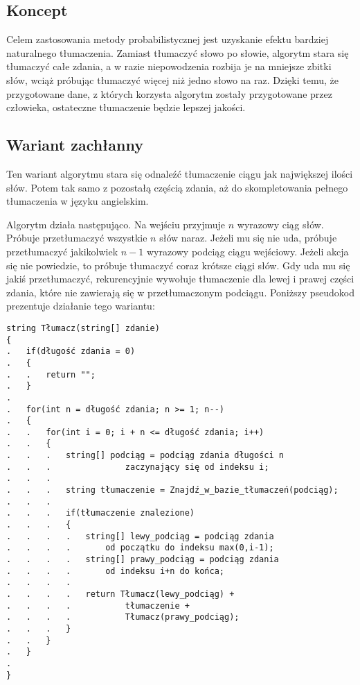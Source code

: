 \subsection{Koncept}
Celem zastosowania metody probabilistycznej jest uzyskanie efektu bardziej naturalnego tłumaczenia. Zamiast tłumaczyć słowo po słowie, algorytm stara się tłumaczyć całe zdania, a w razie niepowodzenia rozbija je na mniejsze zbitki słów, wciąż próbując tłumaczyć więcej niż jedno słowo na raz. Dzięki temu, że przygotowane dane, z których korzysta algorytm zostały przygotowane przez człowieka, ostateczne tłumaczenie będzie lepszej jakości.

\subsection{Wariant zachłanny}
Ten wariant algorytmu stara się odnaleźć tłumaczenie ciągu jak największej ilości słów. Potem tak samo z pozostałą częścią zdania, aż do skompletowania pełnego tłumaczenia w języku angielskim.

Algorytm działa następująco. Na wejściu przyjmuje $n$ wyrazowy ciąg słów. Próbuje przetłumaczyć wszystkie $n$ słów naraz. Jeżeli mu się nie uda, próbuje przetłumaczyć jakikolwiek $n-1$ wyrazowy podciąg ciągu wejściowy. Jeżeli akcja się nie powiedzie, to próbuje tłumaczyć coraz krótsze ciągi słów. Gdy uda mu się jakiś przetłumaczyć, rekurencyjnie wywołuje tłumaczenie dla lewej i prawej części zdania, które nie zawierają się w przetłumaczonym podciągu. Poniższy pseudokod prezentuje działanie tego wariantu: 

\begin{verbatim}
string Tłumacz(string[] zdanie)
{
.   if(długość zdania = 0)
.   {   
.   .   return "";
.   }
.
.   for(int n = długość zdania; n >= 1; n--)
.   {
.   .   for(int i = 0; i + n <= długość zdania; i++)
.   .   {
.   .   .   string[] podciąg = podciąg zdania długości n 
.   .   .               zaczynający się od indeksu i;
.   .   .               
.   .   .   string tłumaczenie = Znajdź_w_bazie_tłumaczeń(podciąg);
.   .   .   
.   .   .   if(tłumaczenie znalezione)
.   .   .   {
.   .   .   .   string[] lewy_podciąg = podciąg zdania 
.   .   .   .       od początku do indeksu max(0,i-1);
.   .   .   .   string[] prawy_podciąg = podciąg zdania
.   .   .   .       od indeksu i+n do końca;
.   .   .   .   
.   .   .   .   return Tłumacz(lewy_podciąg) +
.   .   .   .           tłumaczenie +
.   .   .   .           Tłumacz(prawy_podciąg);
.   .   .   }
.   .   }
.   }
.
}
\end{verbatim}

